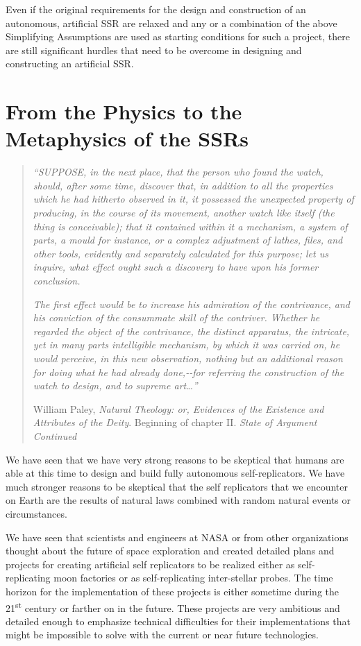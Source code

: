 Even if the original requirements for the design and construction of an
autonomous, artificial SSR are relaxed and any or a combination of the
above Simplifying Assumptions are used as starting conditions for such
a project, there are still significant hurdles that need to be overcome
in designing and constructing an artificial SSR.

\section{From the Physics to the Metaphysics of the SSRs}

\begin{quote}
\textit{“SUPPOSE, in the next place, that the person who found the
watch, should, after some time, discover that, in addition to all the
properties which he had hitherto observed in it, it possessed the
unexpected property of producing, in the course of its movement,
another watch like itself (the thing is conceivable); that it contained
within it a mechanism, a system of parts, a mould for instance, or a
complex adjustment of lathes, files, and other tools, evidently and
separately calculated for this purpose; let us inquire, what effect
ought such a discovery to have upon his former conclusion.}

\textit{The first effect would be to increase his admiration of the
contrivance, and his conviction of the consummate skill of the
contriver. Whether he regarded the object of the contrivance, the
distinct apparatus, the intricate, yet in many parts intelligible
mechanism, by which it was carried on, he would perceive, in this new
observation, nothing but an additional reason for doing what he had
already done,-{}-for referring the construction of the watch to design,
and to supreme art…”}

William Paley, \textit{Natural Theology: or, Evidences of the Existence
and Attributes of the Deity}. Beginning of chapter II. \textit{State of
Argument Continued}%
\end{quote}

We have seen that we have very strong reasons to be skeptical that
humans are able at this time to design and build fully autonomous
self-replicators. We have much stronger reasons to be skeptical that
the self replicators that we encounter on Earth are the results of
natural laws combined with random natural events or circumstances.

We have seen that scientists and engineers at NASA or from other
organizations thought about the future of space exploration and created
detailed plans and projects for creating artificial self replicators to
be realized either as self-replicating moon factories or as
self-replicating inter-stellar probes.  The time horizon for the
implementation of these projects is either sometime during the
21\textsuperscript{st} century or farther on in the future. These
projects are very ambitious and detailed enough to emphasize technical
difficulties for their implementations that might be impossible to
solve with the current or near future technologies.


